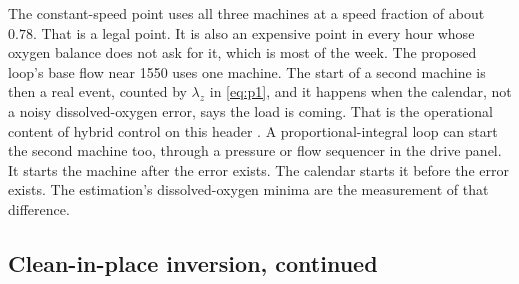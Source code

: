 The constant-speed point uses all three machines at a speed fraction of about $0.78$. That is a legal point. It is also an expensive point in every hour whose oxygen balance does not ask for it, which is most of the week. The proposed loop's base flow near \SI{1550}{\nmcph} uses one machine. The start of a second machine is then a real event, counted by $\lambda_{z}$ in \eqref{eq:p1}, and it happens when the calendar, not a noisy dissolved-oxygen error, says the load is coming. That is the operational content of hybrid control on this header \cite{bemporad1999hybrid,cristea2011}. A proportional-integral loop can start the second machine too, through a pressure or flow sequencer in the drive panel. It starts the machine after the error exists. The calendar starts it before the error exists. The estimation's dissolved-oxygen minima are the measurement of that difference.

\subsection{Clean-in-place inversion, continued}

